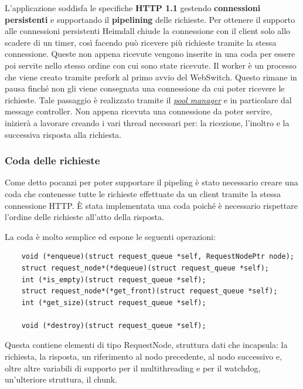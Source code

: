 \documentclass[italian]{tktltiki2}
\begin{document}
L'applicazione soddisfa le specifiche \textbf{HTTP 1.1} gestendo \textbf{connessioni persistenti} e supportando il \textbf{pipelining} delle richieste. Per ottenere il supporto alle connessioni persistenti Heimdall chiude la connessione con il client solo allo scadere di un timer, così facendo può ricevere più richieste tramite la stessa connessione. Queste non appena ricevute vengono inserite in una coda per essere poi servite nello stesso ordine con cui sono state ricevute.
Il worker è un processo che viene creato tramite prefork al primo avvio del WebSwitch. Questo rimane in pausa finché non gli viene consegnata una connessione da cui poter ricevere le richieste. Tale passaggio è realizzato tramite il \hyperref[sec:pool]{\emph{pool manager}} e in particolare dal message controller. Non appena ricevuta una connessione da poter servire, inizierà a lavorare creando i vari thread necessari per: la ricezione, l'inoltro e la successiva risposta alla richiesta.

\subsubsection*{Coda delle richieste}
\label{sec:requests_queue}

Come detto pocanzi per poter supportare il pipeling è stato necessario creare una coda che contenesse tutte le richieste effettuate da un client tramite la stessa connessione HTTP. È stata implementata una coda poiché è necessario rispettare l'ordine delle richieste all'atto della risposta.

La coda è molto semplice ed espone le seguenti operazioni:
\begin{lstlisting}
    void (*enqueue)(struct request_queue *self, RequestNodePtr node);
    struct request_node*(*dequeue)(struct request_queue *self);
    int (*is_empty)(struct request_queue *self);
    struct request_node*(*get_front)(struct request_queue *self);
    int (*get_size)(struct request_queue *self);

    void (*destroy)(struct request_queue *self);
\end{lstlisting}

Questa contiene elementi di tipo RequestNode, struttura dati che incapsula: la richiesta, la risposta, un riferimento al nodo precedente, al nodo successivo e, oltre altre variabili di supporto per il multithreading e per il watchdog, un'ulteriore struttura, il chunk.
\end{document}
